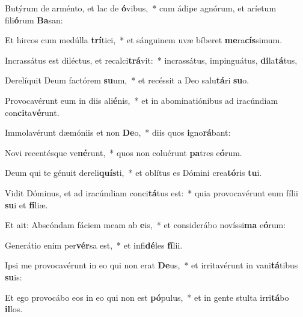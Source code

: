 \item Butýrum de arménto, et lac de \textbf{ó}vibus,~* cum ádipe agnórum, et aríetum fili\textbf{ó}rum \textbf{Ba}san:
\item Et hircos cum medúlla \textbf{trí}tici,~* et sánguinem uvæ bíberet \textbf{me}ra\textbf{cís}simum.
\item Incrassátus est diléctus, et recalci\textbf{trá}vit:~* incrassátus, impinguátus, \textbf{di}la\textbf{tá}tus,
\item Derelíquit Deum factórem \textbf{su}um,~* et recéssit a Deo salu\textbf{tá}ri \textbf{su}o.
\item Provocavérunt eum in diis ali\textbf{é}nis,~* et in abominatiónibus ad iracúndiam con\textbf{ci}ta\textbf{vé}runt.
\item Immolavérunt dæmóniis et non \textbf{De}o,~* diis quos \textbf{i}gno\textbf{rá}bant:
\item Novi recentésque ve\textbf{né}runt,~* quos non coluérunt \textbf{pa}tres e\textbf{ó}rum.
\item Deum qui te génuit dereli\textbf{quís}ti,~* et oblítus es Dómini crea\textbf{tó}ris \textbf{tu}i.
\item Vidit Dóminus, et ad iracúndiam conci\textbf{tá}tus est:~* quia provocavérunt eum fílii \textbf{su}i et \textbf{fí}liæ.
\item Et ait: Abscóndam fáciem meam ab \textbf{e}is,~* et considerábo novíssi\textbf{ma} e\textbf{ó}rum:
\item Generátio enim per\textbf{vér}sa est,~* et infi\textbf{dé}les \textbf{fí}lii.
\item Ipsi me provocavérunt in eo qui non erat \textbf{De}us,~* et irritavérunt in vani\textbf{tá}tibus \textbf{su}is:
\item Et ego provocábo eos in eo qui non est \textbf{pó}pulus,~* et in gente stulta irri\textbf{tá}bo \textbf{il}los.
